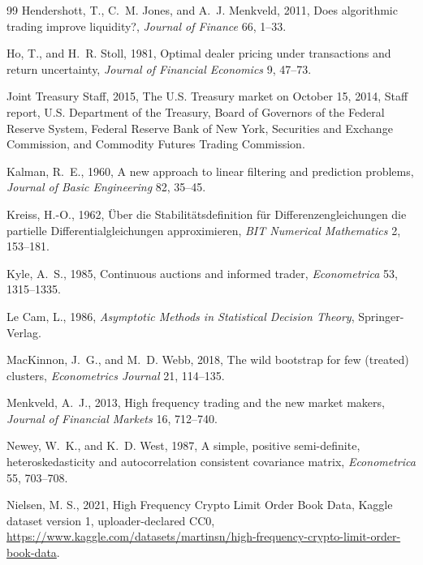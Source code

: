 \documentclass[12pt]{article}
\theoremstyle{definition}
\theoremstyle{remark}
\begin{document}
\begin{thebibliography}{99}
Hendershott, T., C.~M. Jones, and A.~J. Menkveld, 2011, Does algorithmic trading improve liquidity?, \emph{Journal of Finance} 66, 1--33.

Ho, T., and H.~R. Stoll, 1981, Optimal dealer pricing under transactions and return uncertainty, \emph{Journal of Financial Economics} 9, 47--73.

Joint Treasury Staff, 2015, The U.S. Treasury market on October 15, 2014, Staff report, U.S. Department of the Treasury, Board of Governors of the Federal Reserve System, Federal Reserve Bank of New York, Securities and Exchange Commission, and Commodity Futures Trading Commission.

Kalman, R.~E., 1960, A new approach to linear filtering and prediction problems, \emph{Journal of Basic Engineering} 82, 35--45.

Kreiss, H.-O., 1962, {\"U}ber die Stabilit{\"a}tsdefinition f{\"u}r Differenzengleichungen die partielle Differentialgleichungen approximieren, \emph{BIT Numerical Mathematics} 2, 153--181.

Kyle, A.~S., 1985, Continuous auctions and informed trader, \emph{Econometrica} 53, 1315--1335.

Le Cam, L., 1986, \emph{Asymptotic Methods in Statistical Decision Theory}, Springer-Verlag.

MacKinnon, J.~G., and M.~D. Webb, 2018, The wild bootstrap for few (treated) clusters, \emph{Econometrics Journal} 21, 114--135.

Menkveld, A.~J., 2013, High frequency trading and the new market makers, \emph{Journal of Financial Markets} 16, 712--740.

Newey, W.~K., and K.~D. West, 1987, A simple, positive semi-definite, heteroskedasticity and autocorrelation consistent covariance matrix, \emph{Econometrica} 55, 703--708.

Nielsen, M. S., 2021, High Frequency Crypto Limit Order Book Data, Kaggle dataset version 1, uploader-declared CC0, \url{https://www.kaggle.com/datasets/martinsn/high-frequency-crypto-limit-order-book-data}.


\end{thebibliography}
\end{document}
